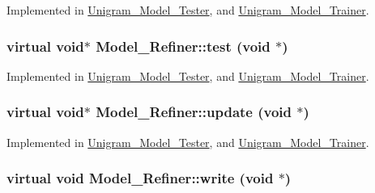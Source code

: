 Implemented in \hyperlink{class_unigram___model___tester_a81e1571fb84f36e059d8e68e01ab91f1}{Unigram\_\-Model\_\-Tester}, and \hyperlink{class_unigram___model___trainer_a03d020dca2c75815773ba726c294e3d1}{Unigram\_\-Model\_\-Trainer}.

\hypertarget{class_model___refiner_a5aeef4eee7a0d4f1878356d891ded76d}{
\subsubsection[{test}]{\setlength{\rightskip}{0pt plus 5cm}virtual void$\ast$ Model\_\-Refiner::test (void $\ast$)}}
\label{class_model___refiner_a5aeef4eee7a0d4f1878356d891ded76d}


Implemented in \hyperlink{class_unigram___model___tester_ab006fec2130a391827c117a126b00d09}{Unigram\_\-Model\_\-Tester}, and \hyperlink{class_unigram___model___trainer_a959873d7b22e159694473fdbcd470785}{Unigram\_\-Model\_\-Trainer}.

\hypertarget{class_model___refiner_a5766465773d95e73a36dac702cfe2298}{
\subsubsection[{update}]{\setlength{\rightskip}{0pt plus 5cm}virtual void$\ast$ Model\_\-Refiner::update (void $\ast$)}}
\label{class_model___refiner_a5766465773d95e73a36dac702cfe2298}


Implemented in \hyperlink{class_unigram___model___tester_a067e8f0f15ce9c48eef77d22978eaceb}{Unigram\_\-Model\_\-Tester}, and \hyperlink{class_unigram___model___trainer_af9031fc304f82bb2f9209c0913f36df6}{Unigram\_\-Model\_\-Trainer}.

\hypertarget{class_model___refiner_a7a98ac7633d5d15d959d9b9c1a414576}{
\subsubsection[{write}]{\setlength{\rightskip}{0pt plus 5cm}virtual void Model\_\-Refiner::write (void $\ast$)}}
\label{class_model___refiner_a7a98ac7633d5d15d959d9b9c1a414576}


